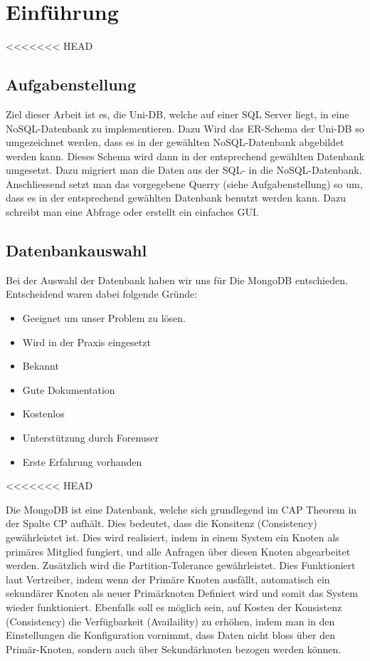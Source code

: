 \section{Einführung}
<<<<<<< HEAD

\subsection{Aufgabenstellung}
Ziel dieser Arbeit ist es, die Uni-DB, welche auf einer SQL Server liegt, in eine NoSQL-Datenbank zu implementieren. Dazu Wird das ER-Schema der Uni-DB so umgezeichnet werden, dass es in der gewählten NoSQL-Datenbank abgebildet werden kann. Dieses Schema wird dann in der entsprechend gewählten Datenbank umgesetzt. Dazu migriert man die Daten aus der SQL- in die NoSQL-Datenbank.
Anschliessend setzt man das vorgegebene Querry (siehe Aufgabenstellung) so um, dass es in der entsprechend gewählten Datenbank benutzt werden kann. Dazu schreibt man eine Abfrage oder erstellt ein einfaches GUI.

\newpage
\subsection{Datenbankauswahl}
Bei der Auswahl der Datenbank haben wir uns für Die MongoDB entschieden. Entscheidend waren dabei folgende Gründe:
\begin{itemize}
  \item Geeignet um unser Problem zu lösen.
  \item Wird in der Praxis eingesetzt
  \item Bekannt
  \item Gute Dokumentation
  \item Kostenlos
  \item Unterstützung durch Forenuser
  \item Erste Erfahrung vorhanden
\end{itemize}
<<<<<<< HEAD

Die MongoDB ist eine Datenbank, welche sich grundlegend im CAP Theorem in der Spalte CP aufhält. Dies bedeutet, dass die Konsitenz (Consistency) gewährleistet ist. Dies wird realisiert, indem in einem System ein Knoten als primäres Mitglied fungiert, und alle Anfragen über diesen Knoten abgearbeitet werden. Zusätzlich wird die Partition-Tolerance gewährleistet. Dies Funktioniert laut Vertreiber, indem wenn der Primäre Knoten ausfällt, automatisch ein sekundärer Knoten als neuer Primärknoten Definiert wird und somit das System wieder funktioniert.
Ebenfalls soll es möglich sein, auf Kosten der Konsistenz (Consistency) die Verfügbarkeit (Availaility) zu erhöhen, indem man in den Einstellungen die Konfiguration vornimmt, dass Daten nicht bloss über den Primär-Knoten, sondern auch über Sekundärknoten bezogen werden können.


